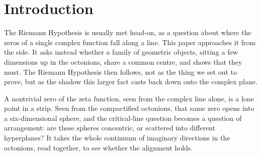 \documentclass[11pt]{article}
\newcommand{\OO}{\mathbb{O}}
\newcommand{\CC}{\mathbb{C}}
\newcommand{\RR}{\mathbb{R}}
\newcommand{\Ostar}{\OO^{*}}
\newcommand{\zetaO}{\zeta_{\Ostar}}
\theoremstyle{plain}
\theoremstyle{definition}
\theoremstyle{remark}
\begin{document}
\begin{abstract}
The residue-$\CC$ inverse-image fibres and their inherited transports assemble
inside $\mathcal T_A$ as the semantic value system $\mathcal R_A$, with fully
faithful inclusion $\int\iota_A:\mathcal R_A\hookrightarrow\mathcal T_A$.
For two arbitrary objects $P=(a,x)$ and $Q=(b,y)$ of $\mathcal R_A$, the
base entries $a$ and $b$ are their unique GPV real fibres. The existing local
continuation supplies
\[
 a\xrightarrow{\,h_1^{-1}\,}p_A\xrightarrow{\,h_2\,}b,
 \qquad h_1:p_A\to a,\quad h_2:p_A\to b.
\]
The ordinary target-fibre action $\alpha=(\mu,\gamma)$ then gives the total
morphism $P\to Q$. Hence $\mathcal R_A$ is transitive, therefore connected.
The construction carries the real structure of the residue outputs into this
value system. Transitivity is applied first: connected components consume all
morphism identifications and give $\pi_0(\mathcal R_A)=\{\kappa\}$. Only after
this collapse is the inherited component read
$\overline L_A:\pi_0(\mathcal R_A)\to\RR$ applied to the sole class $\kappa$.
Writing $c=\overline L_A(\kappa)$, its certified evaluation on
the residue states says that every residue-$\CC$ zero $6$-sphere has centre
$c$. Thus the readout has the exact order
$\mathcal R_A\to\pi_0(\mathcal R_A)=\{\kappa\}\to\RR$. The theorem asserts
the shared centre; naming the number is the task of the corollaries.

Downstream corollaries translate residue-$\CC$ zeros to classically nontrivial zeros and, for
$\zetaO$, use its functional equation to identify $c=\tfrac12$: the Riemann Hypothesis.
\end{abstract}


\tableofcontents

\section*{Introduction}
The Riemann Hypothesis is usually met head-on, as a question about where the zeros of a single complex function fall along a line. This paper approaches it from the side. It asks instead whether a family of geometric objects, sitting a few dimensions up in the octonions, share a common centre, and shows that they must. The Riemann Hypothesis then follows, not as the thing we set out to prove, but as the shadow this larger fact casts back down onto the complex plane.

A nontrivial zero of the zeta function, seen from the complex line alone, is a lone point in a strip. Seen from the compactified octonions, that same zero opens into a six-dimensional sphere, and the critical-line question becomes a question of arrangement: are these spheres concentric, or scattered into different hyperplanes? It takes the whole continuum of imaginary directions in the octonions, read together, to see whether the alignment holds.
\end{document}
